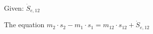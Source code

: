 Given: \( \dot{S}_{e,12} \)

The equation \( m_2 \cdot s_2 - m_1 \cdot s_1 = m_{12} \cdot s_{12} + \dot{S}_{e,12} \)